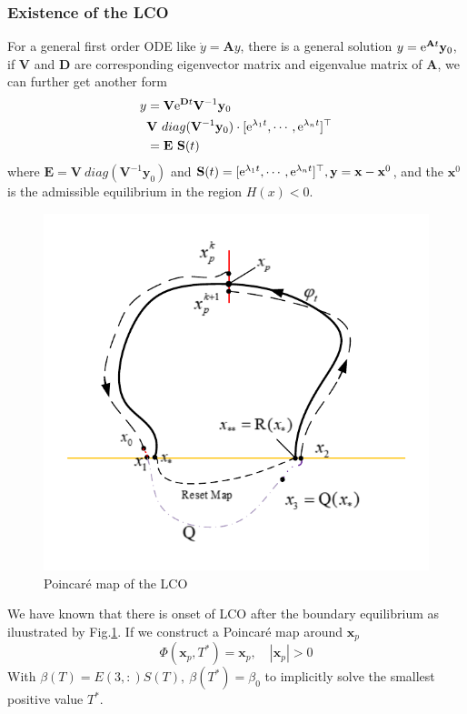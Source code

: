 \documentclass[a4paper,10pt]{article}
\begin{document}
\subsubsection{Existence of the LCO}
For a general first order ODE like $\dot{y} = \mathbf{A}y$, there is a general solution $y={\rm e}^{\mathbf{A}t} \mathbf{y}_0 $, if $\mathbf V$ and $\mathbf D$ are corresponding eigenvector matrix and eigenvalue matrix of $\mathbf{A}$, we can further get another form 
\begin{align}
	\nonumber
	y & =\mathbf{V} {\rm e}^{\mathbf{D}t} \mathbf{V}^{-1} \mathbf{y}_0\\
	& \mathbf{V} ~diag(\mathbf{V}^{-1} \mathbf{y}_0) \cdot [{\rm e}^{\lambda_1 t},\cdots,{\rm e}^{\lambda_n t}]^{\top}				\\
	&= \mathbf{E} ~\mathbf{S}(t)
\end{align}
where $\mathbf{E} = \mathbf{V} ~diag(\mathbf{V}^{-1} \mathbf{y}_0)$ and $\mathbf{S}(t)=[{\rm e}^{\lambda_1 t},\cdots,{\rm e}^{\lambda_n t}]^{\top}, \mathbf{y} =  \mathbf{x} - \mathbf{x}^0$, and the $\mathbf{x}^0$ is the admissible equilibrium in the region $H(x)<0$.
\begin{figure}[h!]
	\centering
	\includegraphics[width=0.5 \linewidth]{BEB_Explanation/figures/PDM.pdf}
	\caption{Poincar{\' e} map of the LCO}
	\label{fig: poincare map}
\end{figure}
We have known that there is onset of LCO after the boundary equilibrium as iluustrated by Fig.\ref{fig: poincare map}. If we construct a Poincar{\' e} map around $\mathbf{x}_p$  
\[
\Phi\left(\mathbf{x}_p,T^*\right)=\mathbf{x}_p, \quad\left|\mathbf{x}_p \right|>0
\]
With $\beta(T)= E(3,:) S(T), ~ \beta(T^*) = \beta_0$ to implicitly solve the smallest positive value $T^*$. 
\end{document}

